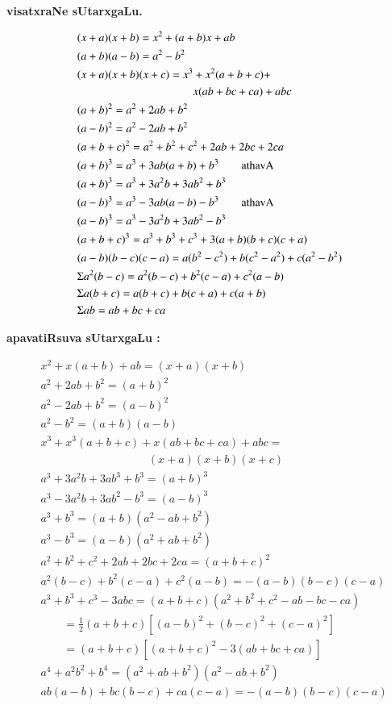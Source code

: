 \centerline{\large\bf visatxraNe sUtarxgaLu. }
\begin{align*}
& (x+a)(x+b)=x^{2}+(a+b)x+ab\\
& (a+b)(a-b)=a^{2}-b^{2}\\
& (x+a)(x+b)(x+c)=x^{3}+x^{2}(a+b+c)+\\
&\hspace{3.6cm} x(ab+bc+ca)+abc\\
& (a+b)^{2}=a^{2}+2ab+b^{2}\\
& (a-b)^{2}=a^{2}-2ab+b^{2}\\
& (a+b+c)^{2}=a^{2}+b^{2}+c^{2}+2ab+2bc+2ca\\
& (a+b)^{3}=a^{3}+3ab(a+b)+b^{3}\qquad\text{athavA}\\
& (a+b)^{3}=a^{3}+3a^{2}b+3ab^{2}+b^{3}\\
& (a-b)^{3}=a^{3}-3ab(a-b)-b^{3}\qquad\text{athavA}\\
& (a-b)^{3}=a^{3}-3a^{2}b+3ab^{2}-b^{3}\\
& (a+b+c)^{3}=a^{3}+b^{3}+c^{3}+3(a+b)(b+c)(c+a)\\
& (a-b)(b-c)(c-a)=a(b^{2}-c^{2})+b(c^{2}-a^{2})+c(a^{2}-b^{2})\\
& \Sigma a^{2}(b-c)=a^{2}(b-c)+b^{2}(c-a)+c^{2}(a-b)\\
& \Sigma a(b+c)=a(b+c)+b(c+a)+c(a+b)\\
& \Sigma ab=ab+bc+ca
\end{align*}
\centerline{\large\bf apavatiRsuva sUtarxgaLu : }
\begin{align*}
& x^{2}+x(a+b)+ab=(x+a)(x+b)\\
& a^{2}+2ab+b^{2}=(a+b)^{2}\\
& a^{2}-2ab+b^{2}=(a-b)^{2}\\
& a^{2}-b^{2}=(a+b)(a-b)\\
& x^{3}+x^{3}(a+b+c)+x(ab+bc+ca)+abc=\\
& \hspace{4cm} (x+a)(x+b)(x+c)\\
& a^{3}+3a^{2}b+3ab^{3}+b^{3}=(a+b)^{3}\\
& a^{3}-3a^{2}b+3ab^{2}-b^{3}=(a-b)^{3}\\
& a^{3}+b^{3}=(a+b)(a^{2}-ab+b^{2})\\
& a^{3}-b^{3}=(a-b)(a^{2}+ab+b^{2})\\
& a^{2}+b^{2}+c^{2}+2ab+2bc+2ca=(a+b+c)^{2}\\
& a^{2}(b-c)+b^{2}(c-a)+c^{2}(a-b)=-(a-b)(b-c)(c-a)\\
& a^{3}+b^{3}+c^{3}-3abc=(a+b+c)(a^{2}+b^{2}+c^{2}-ab-bc-ca)\\
&\qquad = \frac{1}{2}(a+b+c)[(a-b)^{2}+(b-c)^{2}+(c-a)^{2}]\\
&\qquad = (a+b+c)[(a+b+c)^{2}-3(ab+bc+ca)]\\
& a^{4}+a^{2}b^{2}+b^{4}=(a^{2}+ab+b^{2})(a^{2}-ab+b^{2})\\
& ab(a-b)+bc(b-c)+ca(c-a)=-(a-b)(b-c)(c-a)
\end{align*}
